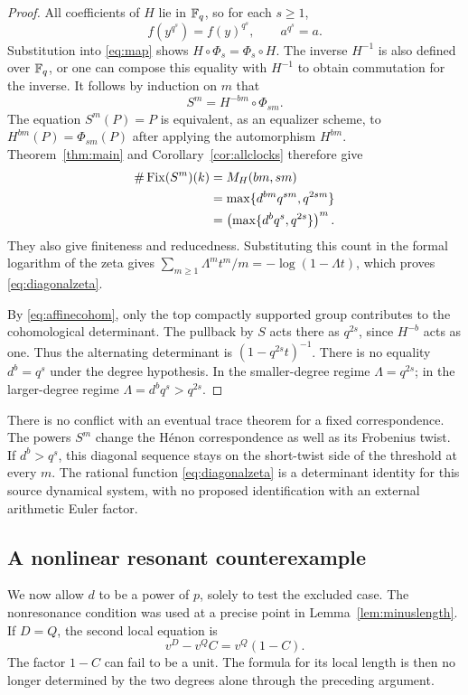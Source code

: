 \begin{proof}
All coefficients of $H$ lie in $\mathbb F_q$, so for each $s\geq1$,
\[
 f(y^{q^s})=f(y)^{q^s},\qquad a^{q^s}=a.
\]
Substitution into \eqref{eq:map} shows $H\circ\Phi_s=\Phi_s\circ H$.
The inverse $H^{-1}$ is also defined over $\mathbb F_q$, or one can compose
this equality with $H^{-1}$ to obtain commutation for the inverse.
It follows by induction on $m$ that
\[
 S^m=H^{-bm}\circ\Phi_{sm}.
\]
The equation $S^m(P)=P$ is equivalent, as an equalizer scheme, to
$H^{bm}(P)=\Phi_{sm}(P)$ after applying the automorphism $H^{bm}$.
Theorem~\ref{thm:main} and Corollary~\ref{cor:allclocks} therefore give
\begin{align*}
 \#\operatorname{Fix}(S^m)(k)
 &=M_H(bm,sm)\\
 &=\max\{d^{bm}q^{sm},q^{2sm}\}\\
 &=\left(\max\{d^bq^s,q^{2s}\}\right)^m.
\end{align*}
They also give finiteness and reducedness. Substituting this count
in the formal logarithm of the zeta gives
$\sum_{m\geq1}\Lambda^m t^m/m=-\log(1-\Lambda t)$,
which proves \eqref{eq:diagonalzeta}.

By \eqref{eq:affinecohom}, only the top compactly supported group
contributes to the cohomological determinant. The pullback by $S$ acts
there as $q^{2s}$, since $H^{-b}$ acts as one. Thus the alternating
determinant is $(1-q^{2s}t)^{-1}$. There is no equality $d^b=q^s$
under the degree hypothesis. In the smaller-degree regime $\Lambda=q^{2s}$;
in the larger-degree regime $\Lambda=d^bq^s>q^{2s}$.
\end{proof}

There is no conflict with an eventual trace theorem for a fixed
correspondence. The powers $S^m$ change the H\'enon correspondence as
well as its Frobenius twist. If $d^b>q^s$, this diagonal sequence stays
on the short-twist side of the threshold at every $m$.
The rational function \eqref{eq:diagonalzeta} is a determinant identity
for this source dynamical system, with no proposed identification with
an external arithmetic Euler factor.

\subsection{A nonlinear resonant counterexample}

We now allow $d$ to be a power of $p$, solely to test the excluded case.
The nonresonance condition was used at a precise point in
Lemma~\ref{lem:minuslength}. If $D=Q$, the second local equation is
\begin{equation}\label{eq:resonantlocaleq}
 v^D-v^QC=v^Q(1-C).
\end{equation}
The factor $1-C$ can fail to be a unit. The formula for its local
length is then no longer determined by the two degrees alone through
the preceding argument.

